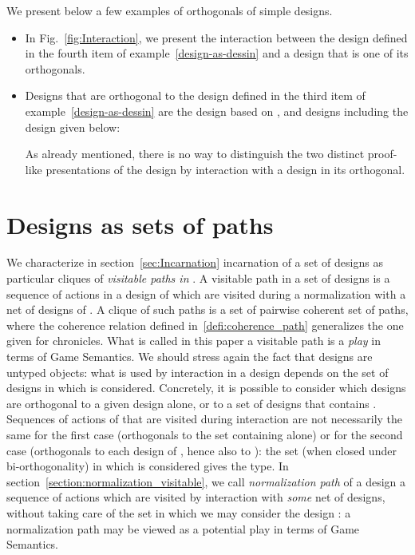 \documentclass{LMCS}
\begin{document}
\begin{exa}
We present below a few examples of orthogonals of simple designs.
\begin{itemize}
\item In Fig.~\ref{fig:Interaction}, we present the interaction between the design  defined in the fourth item of example~\ref{design-as-dessin} and a design  that is one of its orthogonals.
\item 
Designs that are orthogonal to the design  defined in the third item of example~\ref{design-as-dessin} are the design  based on , and designs including the design  given below:

As already mentioned, there is no way to distinguish the two distinct proof-like  presentations of the design  by interaction with a design in its orthogonal.
\end{itemize}
\end{exa}




\section{Designs as sets of paths}\label{sec:Paths}



 We characterize in section~\ref{sec:Incarnation} incarnation of a set of designs  as particular cliques of {\em visitable paths in }. 
 A visitable path in a set of designs  is a sequence of actions  in a design  of  which are visited during a normalization with a net of designs of . A clique of such paths is a set of pairwise coherent set of paths, where the coherence relation defined in~\ref{defi:coherence_path} generalizes the one given for chronicles.
What is called in this paper a visitable path is a {\em play} in terms of Game Semantics. We should stress again the fact that designs are untyped objects: what is used by interaction in a design  depends on the set of designs in which  is considered. Concretely, it is possible to consider which designs are orthogonal to a given design  alone, or to a set of designs  that contains . Sequences of actions of  that are visited during interaction are not necessarily the same for the first case (orthogonals to the set containing  alone) or for the second case (orthogonals to each design of , hence also to ): the set (when closed under bi-orthogonality) in which  is considered gives the type. 
In section~\ref{section:normalization_visitable}, we call {\em normalization path} of a design  a sequence of actions which are visited by interaction with {\em some} net of designs, without taking care of the set in which we may consider the design : a normalization path may be viewed as a potential play in terms of Game Semantics.
\end{document}
